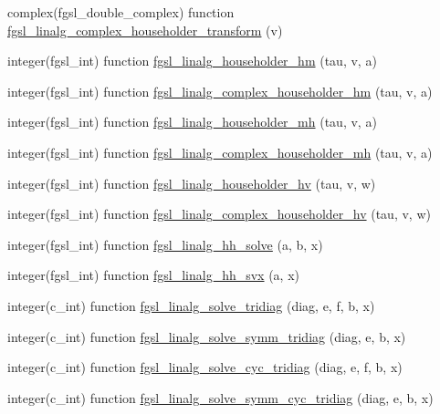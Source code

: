 \begin{DoxyCompactItemize}
\item 
complex(fgsl\+\_\+double\+\_\+complex) function \hyperlink{linalg_8finc_a7bd1bfa2419818da7392462ec4e51a49}{fgsl\+\_\+linalg\+\_\+complex\+\_\+householder\+\_\+transform} (v)
\item 
integer(fgsl\+\_\+int) function \hyperlink{linalg_8finc_abbaccde9508cf3805e8fd920e086b306}{fgsl\+\_\+linalg\+\_\+householder\+\_\+hm} (tau, v, a)
\item 
integer(fgsl\+\_\+int) function \hyperlink{linalg_8finc_a6cfd891d07d48aa2404785b7607a8ca1}{fgsl\+\_\+linalg\+\_\+complex\+\_\+householder\+\_\+hm} (tau, v, a)
\item 
integer(fgsl\+\_\+int) function \hyperlink{linalg_8finc_a0215003deddc89a15be1533dcfadd837}{fgsl\+\_\+linalg\+\_\+householder\+\_\+mh} (tau, v, a)
\item 
integer(fgsl\+\_\+int) function \hyperlink{linalg_8finc_a3c2d047dceeba00601c6a049eedb7c58}{fgsl\+\_\+linalg\+\_\+complex\+\_\+householder\+\_\+mh} (tau, v, a)
\item 
integer(fgsl\+\_\+int) function \hyperlink{linalg_8finc_af93afe6e7341885e9672d74b4d113c62}{fgsl\+\_\+linalg\+\_\+householder\+\_\+hv} (tau, v, w)
\item 
integer(fgsl\+\_\+int) function \hyperlink{linalg_8finc_a577aa9f2f2795c9d8d545502e0baae34}{fgsl\+\_\+linalg\+\_\+complex\+\_\+householder\+\_\+hv} (tau, v, w)
\item 
integer(fgsl\+\_\+int) function \hyperlink{linalg_8finc_a0da76044dd77df2922422968347c1d00}{fgsl\+\_\+linalg\+\_\+hh\+\_\+solve} (a, b, x)
\item 
integer(fgsl\+\_\+int) function \hyperlink{linalg_8finc_ae4d2e360e54f77fbdef78af0fd6c8348}{fgsl\+\_\+linalg\+\_\+hh\+\_\+svx} (a, x)
\item 
integer(c\+\_\+int) function \hyperlink{linalg_8finc_ad5daaa9a613e3d9e8668191df02d1d85}{fgsl\+\_\+linalg\+\_\+solve\+\_\+tridiag} (diag, e, f, b, x)
\item 
integer(c\+\_\+int) function \hyperlink{linalg_8finc_a91cd2d731729955df9677ae3e44b4799}{fgsl\+\_\+linalg\+\_\+solve\+\_\+symm\+\_\+tridiag} (diag, e, b, x)
\item 
integer(c\+\_\+int) function \hyperlink{linalg_8finc_a3a0cc14d7736d7e20be30ed7f07f093e}{fgsl\+\_\+linalg\+\_\+solve\+\_\+cyc\+\_\+tridiag} (diag, e, f, b, x)
\item 
integer(c\+\_\+int) function \hyperlink{linalg_8finc_aea909b87fb81242ac465f6651e63f536}{fgsl\+\_\+linalg\+\_\+solve\+\_\+symm\+\_\+cyc\+\_\+tridiag} (diag, e, b, x)
\item 

\end{DoxyCompactItemize}
